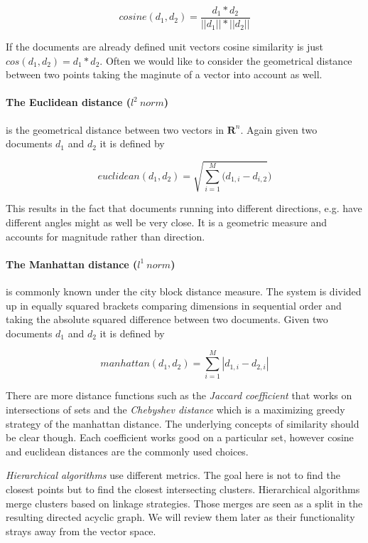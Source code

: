     \begin{equation}
      cosine(d_1, d_2) = \frac{d_1 * d_2}{||d_1|| * ||d_2||}
    \end{equation}

    If the documents are already defined unit vectors cosine similarity is just $cos(d_1, d_2) = d_1 * d_2$. Often we would like to consider the geometrical distance between two points taking the maginute of a vector into account as well.

    \paragraph{The Euclidean distance ($l^2\:norm$)} is the geometrical distance between two vectors in $\mathbf{R}^n$. Again given two documents $d_1$ and $d_2$ it is defined by

    \begin{equation}
      euclidean(d_1, d_2) = \sqrt{\sum_{i=1}^{M}(d_{1,i} - d_{i, 2}})
    \end{equation}

    This results in the fact that documents running into different directions, e.g. have different angles might as well be very close. It is a geometric measure and accounts for magnitude rather than direction.

    \paragraph{The Manhattan distance ($l^1\:norm$)} is commonly known under the city block distance measure. The system is divided up in equally squared brackets comparing dimensions in sequential order and taking the absolute squared difference between two documents. Given two documents $d_1$ and $d_2$ it is defined by

    \begin{equation}
      manhattan(d_1, d_2) = \sum_{i=1}^{M}|d_{1,i} - d_{2,i}|
    \end{equation}

    There are more distance functions such as the \emph{Jaccard coefficient} that works on intersections of sets and the \emph{Chebyshev distance} which is a maximizing greedy strategy of the manhattan distance. The underlying concepts of similarity should be clear though. Each coefficient works good on a particular set, however cosine and euclidean distances are the commonly used choices.

    \emph{Hierarchical algorithms} use different metrics. The goal here is not to find the closest points but to find the closest intersecting clusters. Hierarchical algorithms merge clusters based on linkage strategies. Those merges are seen as a split in the resulting directed acyclic graph. We will review them later as their functionality strays away from the vector space.

